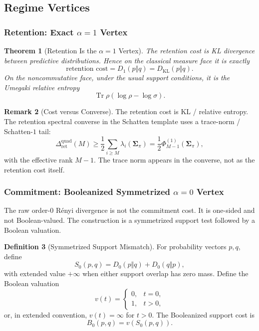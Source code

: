 \documentclass[12pt]{article}
\newtheorem{theorem}{Theorem}[section]
\theoremstyle{definition}
\newtheorem{definition}[theorem]{Definition}
\newtheorem{remark}[theorem]{Remark}
\DeclareMathOperator{\Tr}{Tr}
\newcommand{\RetQuad}{\Delta_{\mathrm{ret}}^{\mathrm{quad}}}
\newcommand{\Ren}[1]{D_{#1}}
\newcommand{\KL}{D_{\mathrm{KL}}}
\begin{document}
\subsection{Regime Vertices}
\label{subsec:exponent-regimes}

\subsubsection{Retention: Exact $\alpha=1$ Vertex}
\label{subsubsec:exponent-retention}

\begin{theorem}[Retention Is the $\alpha=1$ Vertex]
\label{thm:retention-alpha1}
The retention cost is KL divergence between predictive distributions.  Hence
on the classical measure face it is exactly
\[
\text{retention cost}
=
\Ren{1}(p\Vert q)
=
\KL(p\Vert q).
\]
On the noncommutative face, under the usual support conditions, it is the
Umegaki relative entropy
\[
\Tr\rho(\log\rho-\log\sigma).
\]
\end{theorem}

\begin{remark}[Cost versus Converse]
\label{rem:retention-cost-converse}
The retention cost is KL / relative entropy.  The retention spectral converse
in the Schatten template uses a trace-norm / Schatten-$1$ tail:
\[
\RetQuad(M)
\ge
\frac12
\sum_{i\ge M}
\lambda_i(\bm{\Sigma}_\pi)
=
\frac12
\Phi^{(1)}_{M-1}(\bm{\Sigma}_\pi),
\]
with the effective rank $M-1$.  The trace norm appears in the converse, not as
the retention cost itself.
\end{remark}

\subsubsection{Commitment: Booleanized Symmetrized $\alpha=0$ Vertex}
\label{subsubsec:exponent-commitment}

The raw order-$0$ R\'enyi divergence is not the commitment cost.  It is
one-sided and not Boolean-valued.  The construction is a symmetrized support
test followed by a Boolean valuation.

\begin{definition}[Symmetrized Support Mismatch]
\label{def:sym-support}
For probability vectors $p,q$, define
\[
S_0(p,q)
=
\Ren{0}(p\Vert q)+\Ren{0}(q\Vert p),
\]
with extended value $+\infty$ when either support overlap has zero mass.
Define the Boolean valuation
\[
v(t)
=
\begin{cases}
0,& t=0,\\
1,& t>0,
\end{cases}
\]
or, in extended convention, $v(t)=\infty$ for $t>0$.  The Booleanized support
cost is
\[
B_0(p,q)
=
v(S_0(p,q)).
\]
\end{definition}
\end{document}
